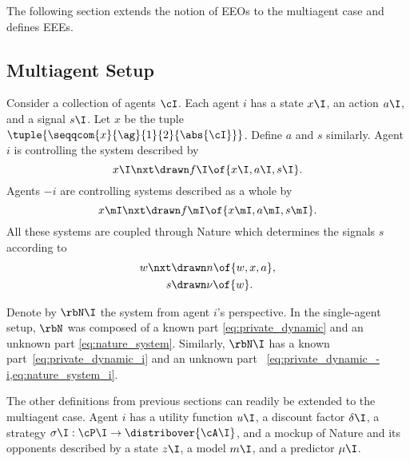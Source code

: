 The following section extends the notion of EEOs to the multiagent case and defines EEEs.

\subsection{Multiagent Setup}

Consider a collection of agents \(\cI\).
Each agent \(i\) has a state \(x\I\), an action \(a\I\), and a signal \(s\I\).
Let \(x\) be the tuple \(\tuple{\seqqcom{x}{\ag}{1}{2}{\abs{\cI}}}\).
Define \(a\) and \(s\) similarly.
Agent \(i\) is controlling the system described by
\begin{equation}
\label{eq:private_dynamic_i}
x\I\nxt \drawn  f\I \of{x\I, a\I, s\I}.
\end{equation}
Agents \(-i\) are controlling systems described as a whole by
\begin{equation}
\label{eq:private_dynamic_-i}
x\mI\nxt \drawn  f\mI \of{x\mI, a\mI, s\mI}.
\end{equation}
All these systems are coupled through Nature which determines the signals \(s\) according to
\begin{subequations}
\label{eq:nature_system_i}
\begin{align}
\label{eq:nature_dynamic_i}
w\nxt &\drawn n \of{w, x, a}, \\
\label{eq:nature_signal_i}
s &\drawn \nu \of{w}.
\end{align}
\end{subequations}

Denote by \(\rbN\I\) the system from agent \(i\)'s perspective.
In the single-agent setup, \(\rbN\) was composed of a known part \cref{eq:private_dynamic} and an unknown part \cref{eq:nature_system}.
Similarly, \(\rbN\I\) has a known part~\cref{eq:private_dynamic_i} and an unknown part~ \cref{eq:private_dynamic_-i,eq:nature_system_i}.

The other definitions from previous sections can readily be extended to the multiagent case.
Agent \(i\) has a utility function \(u\I\), a discount factor \(\delta\I\), a strategy \(\sigma\I : \cP\I \to \distribover{\cA\I}\), and a mockup of Nature and its opponents described by a state \(z\I\), a model \(m\I\), and a predictor \(\mu\I\).

